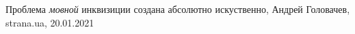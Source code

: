  
 
 
 
 
Проблема \emph{мовной} инквизиции создана абсолютно искуственно, Андрей
Головачев, strana.ua, 20.01.2021
